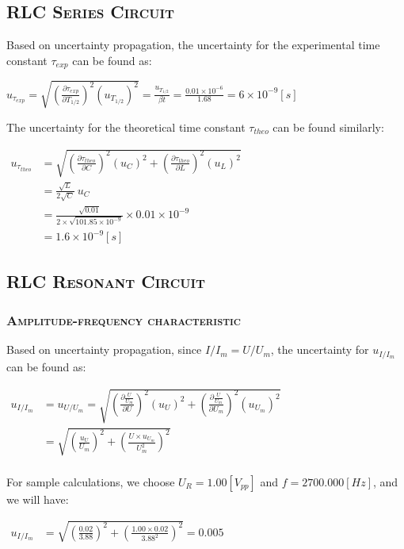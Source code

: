 \documentclass[a4paper,12pt]{article}
\begin{document}
\begin{appendices}
\subsection{\textsc{RLC Series Circuit}}
Based on uncertainty propagation, the uncertainty for the experimental time constant $ \tau_{exp} $ can be found as:
\begin{center}
$ \displaystyle u_{\tau_{exp}} = \sqrt{(\frac{\partial \tau_{exp}}{\partial T_{1/2}})^2(u_{T_{1/2}})^2} = \frac{u_{T_{1/2}}}{\beta t} = \frac{0.01\times 10^{-6}}{1.68} = 6 \times 10^{-9} [s] $
\end{center}
The uncertainty for the theoretical time constant $ \tau_{theo} $ can be found similarly:
\begin{center}
$ \displaystyle  
\begin{aligned} 
	u_{\tau_{theo}} &= \sqrt{(\frac{\partial \tau_{theo}}{\partial C})^2(u_C)^2 + (\frac{\partial \tau_{theo}}{\partial L})^2(u_L)^2} \\ 
		&= \frac{\sqrt{L}}{2\sqrt{C}}~u_C \\ 
		&= \frac{\sqrt{0.01}}{2 \times \sqrt{101.85\times 10^{-9}}}\times 0.01 \times 10^{-9} \\
		&= 1.6 \times 10^{-9} [s] 
\end{aligned}$
\end{center}

\subsection{\textsc{RLC Resonant Circuit}}
\subsubsection{\textsc{Amplitude-frequency characteristic}}
Based on uncertainty propagation, since $I/I_m = U/U_m$, the uncertainty for $u_{I/I_m}$ can be found as:
\begin{center}
$ \displaystyle  
\begin{aligned} 
	u_{I/I_m} &= u_{U/U_m} = \sqrt{(\frac{\partial \frac{U}{U_m}}{\partial U})^2(u_U)^2 + (\frac{\partial \frac{U}{U_m}}{\partial U_m})^2(u_{U_m})^2} \\
		&= \sqrt{(\frac{u_U}{U_m})^2 + (\frac{U\times u_{U_m}}{U_m^2})^2} \\ 
\end{aligned}$
\end{center}
For sample calculations, we choose $U_R = 1.00 [V_{pp}]$ and $f = 2700.000[Hz]$, and we will have:
\begin{center}
$ \displaystyle  
\begin{aligned} 
	u_{I/I_m} &= \sqrt{(\frac{0.02}{3.88})^2 + (\frac{1.00 \times 0.02}{3.88^2})^2} = 0.005\\ 
\end{aligned}$
\end{center}


\end{appendices}
\end{document}
